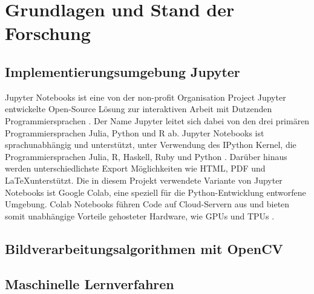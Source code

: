 \chapter{Grundlagen und Stand der Forschung}


\section{Implementierungsumgebung Jupyter}
\par
Jupyter Notebooks ist eine von der non-profit Organisation Project Jupyter entwickelte Open-Source Lösung zur interaktiven Arbeit mit Dutzenden Programmiersprachen \cite{project_jupyter}. Der Name Jupyter leitet sich dabei von den drei primären Programmiersprachen Julia, Python und R ab. Jupyter Notebooks ist sprachunabhängig und unterstützt, unter Verwendung des IPython \gls{Kernel}, die Programmiersprachen Julia, R, Haskell, Ruby und Python \cite{jupyter_kernel}. Darüber hinaus werden unterschiedlichste Export Möglichkeiten wie \ac{HTML}, \ac{PDF} und \LaTeX \space unterstützt. Die in diesem Projekt verwendete Variante von Jupyter Notebooks ist Google Colab, eine speziell für die Python-Entwicklung entworfene Umgebung. Colab Notebooks führen Code auf Cloud-Servern aus und bieten somit unabhängige Vorteile gehosteter Hardware, wie \acp{GPU} und \acp{TPU} \cite{colab_notebooks}.

\section{Bildverarbeitungsalgorithmen mit OpenCV}

\section{Maschinelle Lernverfahren}

